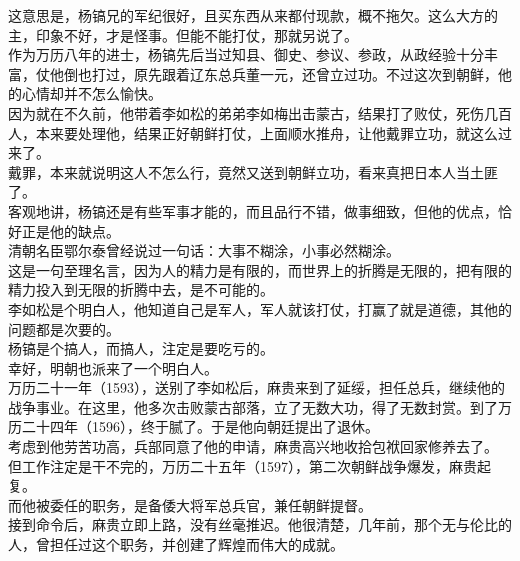 \begin{multicols}{\theparacolNo}
这意思是，杨镐兄的军纪很好，且买东西从来都付现款，概不拖欠。这么大方的主，印象不好，才是怪事。但能不能打仗，那就另说了。\\

作为万历八年的进士，杨镐先后当过知县、御史、参议、参政，从政经验十分丰富，仗他倒也打过，原先跟着辽东总兵董一元，还曾立过功。不过这次到朝鲜，他的心情却并不怎么愉快。\\

因为就在不久前，他带着李如松的弟弟李如梅出击蒙古，结果打了败仗，死伤几百人，本来要处理他，结果正好朝鲜打仗，上面顺水推舟，让他戴罪立功，就这么过来了。\\

戴罪，本来就说明这人不怎么行，竟然又送到朝鲜立功，看来真把日本人当土匪了。\\

客观地讲，杨镐还是有些军事才能的，而且品行不错，做事细致，但他的优点，恰好正是他的缺点。\\

清朝名臣鄂尔泰曾经说过一句话：大事不糊涂，小事必然糊涂。\\

这是一句至理名言，因为人的精力是有限的，而世界上的折腾是无限的，把有限的精力投入到无限的折腾中去，是不可能的。\\

李如松是个明白人，他知道自己是军人，军人就该打仗，打赢了就是道德，其他的问题都是次要的。\\

杨镐是个搞人，而搞人，注定是要吃亏的。\\

幸好，明朝也派来了一个明白人。\\

万历二十一年（1593），送别了李如松后，麻贵来到了延绥，担任总兵，继续他的战争事业。在这里，他多次击败蒙古部落，立了无数大功，得了无数封赏。到了万历二十四年（1596），终于腻了。于是他向朝廷提出了退休。\\

考虑到他劳苦功高，兵部同意了他的申请，麻贵高兴地收拾包袱回家修养去了。\\

但工作注定是干不完的，万历二十五年（1597），第二次朝鲜战争爆发，麻贵起复。\\

而他被委任的职务，是备倭大将军总兵官，兼任朝鲜提督。\\

接到命令后，麻贵立即上路，没有丝毫推迟。他很清楚，几年前，那个无与伦比的人，曾担任过这个职务，并创建了辉煌而伟大的成就。\\


\end{multicols}
